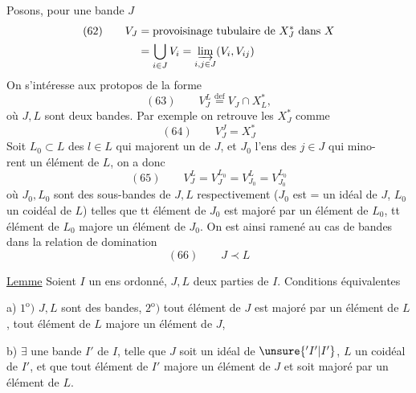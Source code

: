 Posons, pour une bande $J$
\[
\begin{aligned}
(62)\qquad V_J&=\text{provoisinage tubulaire de }X_J^*\text{ dans }X\\
&=\bigcup_{i\in J}V_i=\varinjlim_{i,j\in J}(V_i,V_{ij})
\end{aligned}
\]
On s'intéresse aux protopos de la forme
\[
(63)\qquad V_J^L\overset{\mathrm{def}}{=}V_J\cap X_L^*,
\]
où $J,L$ sont deux bandes. Par exemple on retrouve les $X_J^*$ comme
\[
(64)\qquad V_J^J=X_J^*
\]
Soit $L_0\subset L$  des $l\in L$ qui majorent un  de $J$, et $J_0$ l'ens des $j\in J$ qui mino-\\rent un élément de $L$, on a donc
\[
(65)\qquad V_J^L=V_J^{L_0}=V_{J_0}^L=V_{J_0}^{L_0}
\]
où $J_0,L_0$ sont des sous-bandes de $J,L$ respectivement ($J_0$ est = un idéal de $J$, $L_0$ un coidéal de $L$) telles que tt élément de $J_0$ est majoré par un élément de $L_0$, tt élément de $L_0$ majore un élément de $J_0$. On est ainsi ramené au cas de bandes dans la relation de domination
\[
(66)\qquad J\prec L
\]


\uline{Lemme} Soient $I$ un ens ordonné, $J,L$ deux parties de $I$. Conditions équivalentes

a) $1^{\mathrm o})$ $J,L$ sont des bandes, $2^{\mathrm o})$ tout élément de $J$ est majoré par un élément de $L$, tout élément de $L$ majore un élément de $J$, 

b) $\exists$ une bande $I'$ de $I$, telle que $J$ soit un idéal de $\unsure{{}'I'|I'}$, $L$ un coidéal de $I'$, et que tout élément de $I'$ majore un élément de $J$ et soit majoré par un élément de $L$.


